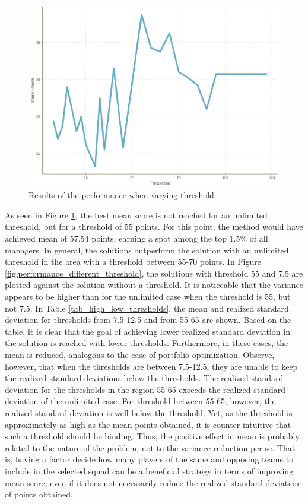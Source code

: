 \begin{figure}[H]
    \centering
    \includegraphics[scale=0.5]{fig/chapter_7/var.png}
    \caption{Results of the performance when varying threshold.}
\label{fig:performance_varying_threshold}    
\end{figure}%


As seen in Figure \ref{fig:performance_varying_threshold}, the best mean score is not reached for an unlimited threshold, but for a threshold of 55 points. For this point, the method would have achieved mean of 57.54 points, earning a spot among the top 1.5\% of all managers. In general, the solutions outperform the solution with an unlimited threshold in the area with a threshold between 55-70 points. In Figure \ref{fig:performance_different_threshold}, the solutions with threshold 55 and 7.5 are plotted against the solution without a threshold. It is noticeable that the variance appears to be higher than for the unlimited case when the threshold is 55, but not 7.5. In Table \ref{tab_high_low_thresholds}, the mean and realized standard deviation for thresholds from 7.5-12.5 and from 55-65 are shown. Based on the table, it is clear that the goal of achieving lower realized standard deviation in the solution is reached with lower thresholds. Furthermore, in these cases, the mean is reduced, analogous to the case of portfolio optimization. Observe, however, that when the thresholds are between 7.5-12.5, they are unable to keep the realized standard deviations below the thresholds. The realized standard deviation for the thresholds in the region 55-65 exceeds the realized standard deviation of the unlimited case. For threshold between 55-65, however, the realized standard deviation is well below the threshold. Yet, as the threshold is approximately as high as the mean points obtained, it is counter intuitive that such a threshold should be binding. Thus, the positive effect in mean is probably related to the nature of the problem, not to the variance reduction per se. That is, having a factor decide how many players of the same and opposing teams to include in the selected squad can be a beneficial strategy in terms of improving mean score, even if it does not necessarily reduce the realized standard deviation of points obtained.




